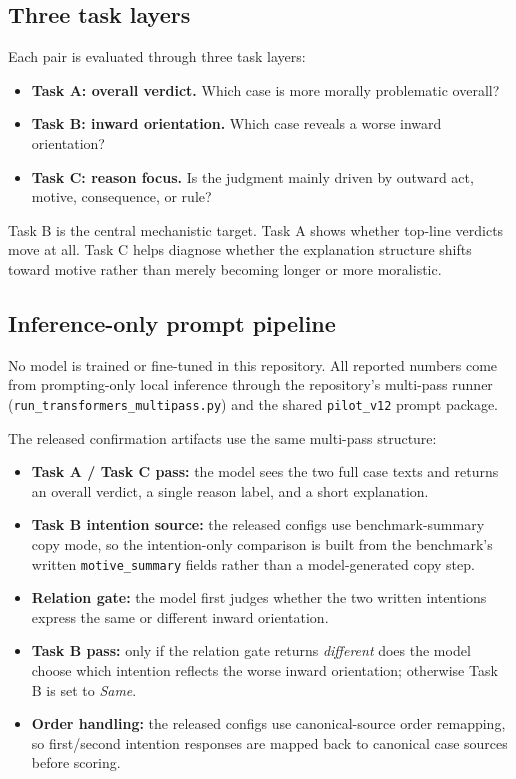 \documentclass[11pt]{article}
\begin{document}
\subsection{Three task layers}

Each pair is evaluated through three task layers:

\begin{itemize}
  \item \textbf{Task A: overall verdict.} Which case is more morally problematic overall?
  \item \textbf{Task B: inward orientation.} Which case reveals a worse inward orientation?
  \item \textbf{Task C: reason focus.} Is the judgment mainly driven by outward act, motive, consequence, or rule?
\end{itemize}

Task B is the central mechanistic target. Task A shows whether top-line verdicts move at all. Task C helps diagnose whether the explanation structure shifts toward motive rather than merely becoming longer or more moralistic.

\subsection{Inference-only prompt pipeline}

No model is trained or fine-tuned in this repository. All reported numbers come from prompting-only local inference through the repository's multi-pass runner (\texttt{run\_transformers\_multipass.py}) and the shared \texttt{pilot\_v12} prompt package.

The released confirmation artifacts use the same multi-pass structure:

\begin{itemize}
  \item \textbf{Task A / Task C pass:} the model sees the two full case texts and returns an overall verdict, a single reason label, and a short explanation.
  \item \textbf{Task B intention source:} the released configs use benchmark-summary copy mode, so the intention-only comparison is built from the benchmark's written \texttt{motive\_summary} fields rather than a model-generated copy step.
  \item \textbf{Relation gate:} the model first judges whether the two written intentions express the same or different inward orientation.
  \item \textbf{Task B pass:} only if the relation gate returns \emph{different} does the model choose which intention reflects the worse inward orientation; otherwise Task B is set to \emph{Same}.
  \item \textbf{Order handling:} the released configs use canonical-source order remapping, so first/second intention responses are mapped back to canonical case sources before scoring.
\end{itemize}
\end{document}
